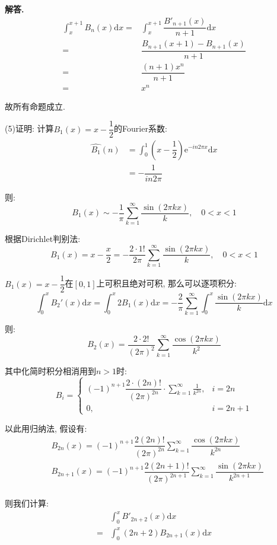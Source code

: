 \documentclass[12pt, a4paper, oneside]{ctexart}
\newenvironment{solution}{\par\noindent\textbf{解答. }}{\par}
\begin{document}
\begin{solution}
$$\begin{aligned}
    \int_{x}^{x+1}B_n(x)\mathrm{d}x
    =&\int_{x}^{x+1}\dfrac{B'_{n+1}(x)}{n+1}\mathrm{d}x\\
    =&\dfrac{B_{n+1}(x+1)-B_{n+1}(x)}{n+1}\\
    =&\dfrac{(n+1)x^n}{n+1}\\
    =&x^n
\end{aligned}
$$
\par
故所有命题成立.
\par
(5)证明:
计算$B_1(x)=x-\dfrac{1}{2}$的Fourier系数:
$$
\begin{aligned}
\widehat{B_1}(n)&=\int_{0}^{1}\left(x-\dfrac{1}{2}\right)\mathrm{e}^{-in2\pi x}\mathrm{d}x\\
&=-\dfrac{1}{in2\pi}
\end{aligned}
$$
\par
则:
$$
B_1(x)\sim -\dfrac{1}{\pi}\sum_{k=1}^{\infty}\dfrac{\sin (2\pi kx)}{k},\quad 0<x<1
$$
\par
根据Dirichlet判别法:
$$
B_1(x)=x-\dfrac{x}{2}=-\dfrac{2\cdot 1!}{2\pi}\sum_{k=1}^{\infty}\dfrac{\sin(2\pi kx)}{k},\quad 0<x<1
$$
\par
$B_1(x)=x-\dfrac{1}{2}$在$[0,1]$上可积且绝对可积,
那么可以逐项积分:
$$
\int_{0}^{x} B_2'(x)\mathrm{d}x=
\int_{0}^{x} 2B_1(x)\mathrm{d}x
=-\dfrac{2}{\pi}\sum_{k=1}^{\infty}\int_{0}^{x}\dfrac{\sin(2\pi kx)}{k}\mathrm{d}x
$$
\par
则:
$$
B_2(x)=\dfrac{2\cdot 2!}{(2\pi)^2}\sum_{k=1}^{\infty}\dfrac{\cos(2\pi kx)}{k^2}
$$
\par
其中化简时积分相消用到$n>1$时:
$$
B_i=
\begin{cases}
    (-1)^{n+1}\dfrac{2\cdot (2n)!}{(2\pi)^{2n}}\cdot \displaystyle{\sum_{k=1}^{\infty}\frac{1}{k^{2n}}}, &i=2n\\
    0,&i=2n+1
\end{cases}
$$
\par
以此用归纳法,
假设有:
$$
\begin{aligned}
   & B_{2n}(x)=(-1)^{n+1}\dfrac{2(2n)!}{(2\pi)^{2n}}\sum_{k=1}^{\infty}\dfrac{\cos(2\pi kx)}{k^{2n}}\\
   & B_{2n+1}(x)=(-1)^{n+1}\dfrac{2(2n+1)!}{(2\pi)^{2n+1}}\sum_{k=1}^{\infty}\dfrac{\sin (2\pi kx)}{k^{2n+1}}\\
\end{aligned}
$$
\par
则我们计算:
$$
\begin{aligned}
&\int_{0}^{x}B'_{2n+2}(x)\mathrm{d}x\\
=&\int_{0}^{x}(2n+2)B_{2n+1}(x)\mathrm{d}x\\

\end{aligned}$$
\end{solution}
\end{document}
